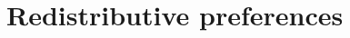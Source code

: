 \documentclass[11pt, headsepline]{article}
\begin{document}






    

    

\section*{Redistributive preferences}
\end{document}
